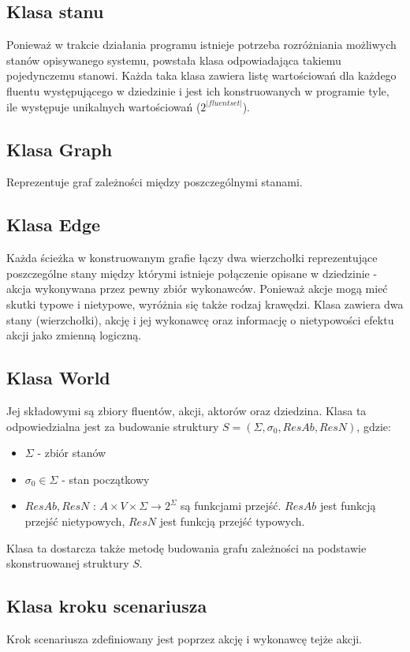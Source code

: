 \documentclass{article}
\begin{document}
\subsection{Klasa stanu}
Ponieważ w trakcie działania programu istnieje potrzeba rozróżniania możliwych stanów opisywanego systemu, powstała klasa odpowiadająca takiemu pojedynczemu stanowi. Każda taka klasa zawiera listę wartościowań dla każdego fluentu występującego w dziedzinie i jest ich konstruowanych w programie tyle, ile występuje unikalnych wartościowań ($2^{|fluent set|}$).

\subsection{Klasa Graph}
Reprezentuje graf zależności między poszczególnymi stanami.

\subsection{Klasa Edge}
Każda ścieżka w konstruowanym grafie łączy dwa wierzchołki reprezentujące poszczególne stany między którymi istnieje połączenie opisane w dziedzinie - akcja wykonywana przez pewny zbiór wykonawców. Ponieważ akcje mogą mieć skutki typowe i nietypowe, wyróżnia się także rodzaj krawędzi. Klasa zawiera dwa stany (wierzchołki), akcję i jej wykonawcę oraz informację o nietypowości efektu akcji jako zmienną logiczną.

\subsection{Klasa World}
Jej składowymi są zbiory fluentów, akcji, aktorów oraz dziedzina. Klasa ta odpowiedzialna jest za budowanie struktury $S=(\Sigma, \sigma_{0}, ResAb, ResN)$, gdzie:
\begin{itemize}
\item $\Sigma$ - zbiór stanów
\item $\sigma_{0} \in \Sigma$ - stan początkowy
\item $ResAb, ResN$ : $A\times V \times \Sigma \to 2^{\Sigma}$ są funkcjami przejść. $ResAb$ jest funkcją przejść nietypowych, $ResN$ jest funkcją przejść typowych.
\end{itemize}
Klasa ta dostarcza także metodę budowania grafu zależności na podstawie skonstruowanej struktury $S$. 

\subsection{Klasa kroku scenariusza}
Krok scenariusza zdefiniowany jest poprzez akcję i wykonawcę tejże akcji.
\end{document}

